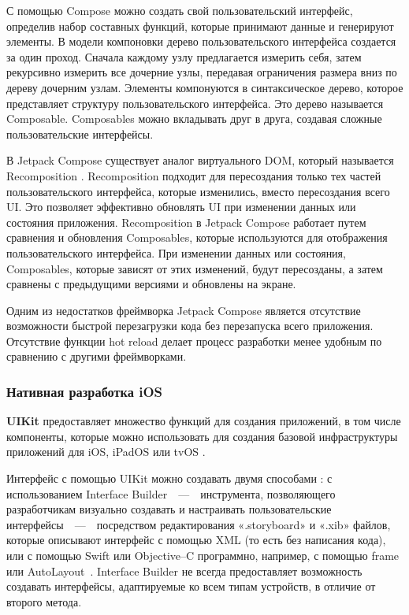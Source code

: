 С помощью Compose можно создать свой пользовательский интерфейс, определив набор составных функций, которые принимают данные и генерируют элементы. 
В модели компоновки дерево пользовательского интерфейса создается за один проход. 
Сначала каждому узлу предлагается измерить себя, затем рекурсивно измерить все дочерние узлы, передавая ограничения размера вниз по дереву дочерним узлам. 
Элементы компонуются в синтаксическое дерево, которое представляет структуру пользовательского интерфейса. 
Это дерево называется Composable.
Composables можно вкладывать друг в друга, создавая сложные пользовательские интерфейсы.

В Jetpack Compose существует аналог виртуального DOM, который называется Recomposition \cite{jetpack-lifecycle}. 
Recomposition подходит для пересоздания только тех частей пользовательского интерфейса, которые изменились, вместо пересоздания всего UI. 
Это позволяет эффективно обновлять UI при изменении данных или состояния приложения.
Recomposition в Jetpack Compose работает путем сравнения и обновления Composables, которые используются для отображения пользовательского интерфейса. 
При изменении данных или состояния, Composables, которые зависят от этих изменений, будут пересозданы, а затем сравнены с предыдущими версиями и обновлены на экране.

Одним из недостатков фреймворка Jetpack Compose является отсутствие возможности быстрой перезагрузки кода без перезапуска всего приложения.
Отсутствие функции hot reload делает процесс разработки менее удобным по сравнению с другими фреймворками.

\subsubsection{Нативная разработка iOS} 

\textbf{UIKit} предоставляет множество функций для создания приложений, в том числе компоненты, которые можно использовать для создания базовой инфраструктуры приложений для iOS, iPadOS или tvOS \cite{uikit}.

Интерфейс с помощью UIKit можно создавать двумя способами \cite{uikit2}: с использованием Interface Builder~~---~~инструмента, позволяющего разработчикам визуально создавать и настраивать пользовательские интерфейсы~~---~~посредством редактирования «.storyboard» и «.xib» файлов, которые описывают интерфейс с помощью XML (то есть без написания кода), или с помощью Swift или Objective--C программно, например, с помощью frame \cite{uikit-frame} или AutoLayout~\cite{uikit-autolayout}. 
Interface Builder не всегда предоставляет возможность создавать интерфейсы, адаптируемые ко всем типам устройств, в отличие от второго метода. 

